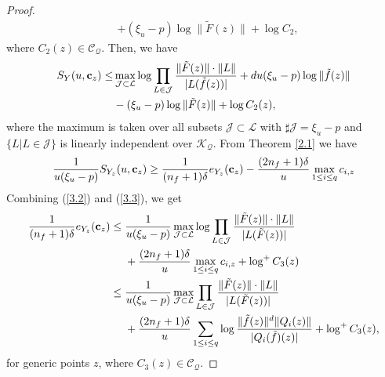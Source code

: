 \documentclass[12pt,leqno]{amsart}
\numberwithin{equation}{section}
\begin{document}
\begin{proof}
\begin{align*}
&+(\xi_u-p)\log \|\tilde F(z)\|+\log C_2,
\end{align*}
where $C_2(z)\in\mathcal C_{\mathcal Q}$. Then, we have
\begin{align}\label{3.2}
\begin{split}
S_Y(u,{\bf c}_z)\le&\max_{\mathcal J\subset\mathcal L}\log\prod_{L\in \mathcal J}\dfrac{\|\tilde F(z)\|\cdot \|L\|}{|L(\tilde f(z))|}+du(\xi_u-p)\log \|\tilde f(z)\|\\
& -(\xi_u-p)\log \|\tilde F(z)\|+\log C_2(z),
\end{split}
\end{align}
where the maximum is taken over all subsets $\mathcal J\subset\mathcal L$ with $\sharp\mathcal J=\xi_u-p$ and $\{L|L\in\mathcal J\}$ is linearly independent over $\mathcal K_{\mathcal Q}$.
From Theorem \ref{2.1} we have
\begin{align}\label{3.3}
\dfrac{1}{u(\xi_u-p)}S_{Y_z}(u,{\bf c}_z)\ge\frac{1}{(n_f+1)\delta}e_{Y_z}({\bf c}_z)-\frac{(2n_f+1)\delta}{u}\max_{1\le i\le q}c_{i,z}
\end{align}
Combining (\ref{3.2}) and (\ref{3.3}), we get
\begin{align}\label{3.4}
\begin{split}
\frac{1}{(n_f+1)\delta}e_{Y_z}({\bf c}_z)
&\le\dfrac{1}{u(\xi_u-p)}\max_{\mathcal J\subset\mathcal L}\log\prod_{L\in \mathcal J}\dfrac{\|\tilde F(z)\|\cdot \|L\|}{|L(\tilde F(z))|}\\
&\ \ \ \ +\frac{(2n_f+1)\delta}{u}\max_{1\le i\le q}c_{i,z}+\log^+C_3(z)\\
&\le\dfrac{1}{u(\xi_u-p)}\max_{\mathcal J\subset\mathcal L}\prod_{L\in\mathcal J}\dfrac{\|\tilde F(z)\|\cdot \|L\|}{|L(\tilde F(z))|}\\
&\ \ \ \ +\frac{(2n_f+1)\delta}{u}\sum_{1\le i\le q}\log\frac{\|\tilde f(z)\|^d\|Q_i(z)\|}{|Q_i(\tilde f)(z)|}+\log^+C_3(z),
\end{split}
\end{align}
for generic points $z$, where $C_3(z)\in\mathcal C_{\mathcal Q}$.


\end{proof}
\end{document}
